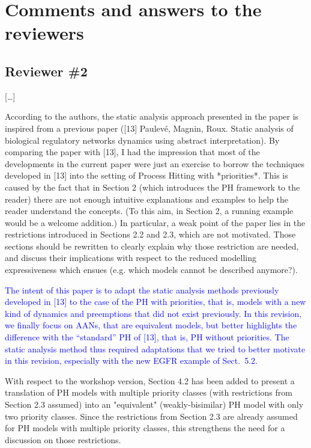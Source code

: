\documentclass[11pt]{article}
\newcommand{\answer}[1]{\textcolor{blue}{#1}\vspace*{1em}}
\begin{document}
\section*{Comments and answers to the reviewers}

\subsection*{Reviewer \#2}

[…]

According to the authors, the static analysis approach presented in the paper is inspired from a previous paper ([13] Paulevé, Magnin, Roux. Static analysis of biological regulatory networks dynamics using abstract interpretation). By comparing the paper with [13], I had the impression that most of the developments in the current paper were just an exercise to borrow the techniques developed in [13] into the setting of Process Hitting with *priorities*. This is caused by the fact that in Section 2 (which introduces the PH framework to the reader) there are not enough intuitive explanations and examples to help the reader understand the concepts. (To this aim, in Section 2, a running example would be a welcome addition.)
In particular, a weak point of the paper lies in the restrictions introduced in Sections 2.2 and 2.3, which are not motivated. Those sections should be rewritten to clearly explain why those restriction are needed, and discuss their implications with respect to the reduced modelling expressiveness which ensues (e.g. which models cannot be described anymore?).

\answer{
The intent of this paper is to adapt the static analysis methods previously developed in [13] to the case of the PH with priorities, that is, models with a new kind of dynamics and preemptions that did not exist previously.
In this revision, we finally focus on AANs, that are equivalent models,
but better highlights the difference with the “standard” PH of [13],
that is, PH without priorities.
The static analysis method thus required adaptations
that we tried to better motivate in this revision,
especially with the new EGFR example of Sect.~5.2.
}

With respect to the workshop version, Section 4.2 has been added to present a translation of PH models with multiple priority classes (with restrictions from Section 2.3 assumed) into an "equivalent" (weakly-bisimilar) PH model with only two priority classes. Since the restrictions from Section 2.3 are already assumed for PH models with multiple priority classes, this strengthens the need for a discussion on those restrictions.
\end{document}
